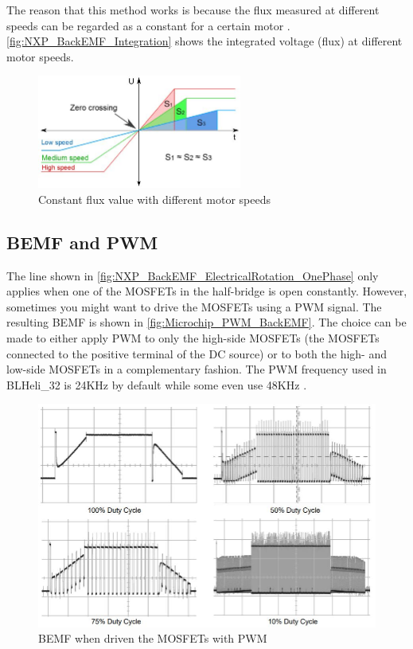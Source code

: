 \documentclass[]{report}
\begin{document}
The reason that this method works is because the flux measured at different speeds can be regarded as a constant for a certain motor \cite{NXP_AN4597}. \autoref{fig:NXP_BackEMF_Integration} shows the integrated voltage (flux) at different motor speeds.

\begin{figure}[H]
	\centering
	\includegraphics[width=0.6\textwidth]{NXP_BackEMF_Integration.JPG}
	\caption{Constant flux value with different motor speeds \cite{NXP_AN4597}}
	\label{fig:NXP_BackEMF_Integration}
\end{figure}

\subsection{BEMF and PWM}
The line shown in \autoref{fig:NXP_BackEMF_ElectricalRotation_OnePhase} only applies when one of the MOSFETs in the half-bridge is open constantly. However, sometimes you might want to drive the MOSFETs using a PWM signal. The resulting BEMF is shown in \autoref{fig:Microchip_PWM_BackEMF}. The choice can be made to either apply PWM to only the high-side MOSFETs (the MOSFETs connected to the positive terminal of the DC source) or to both the high- and low-side MOSFETs in a complementary fashion. The PWM frequency used in BLHeli\_32 is 24KHz by default while some even use 48KHz \cite{BLHeli_32_PWM_Frequency}. 

 \begin{figure}[H]
 	\centering
 	\includegraphics[width=\textwidth]{Microchip_PWM_BackEMF.JPG}
 	\caption{BEMF when driven the MOSFETs with PWM \cite{Microchip_AN857}}
 	\label{fig:Microchip_PWM_BackEMF}
 \end{figure}
\end{document}
